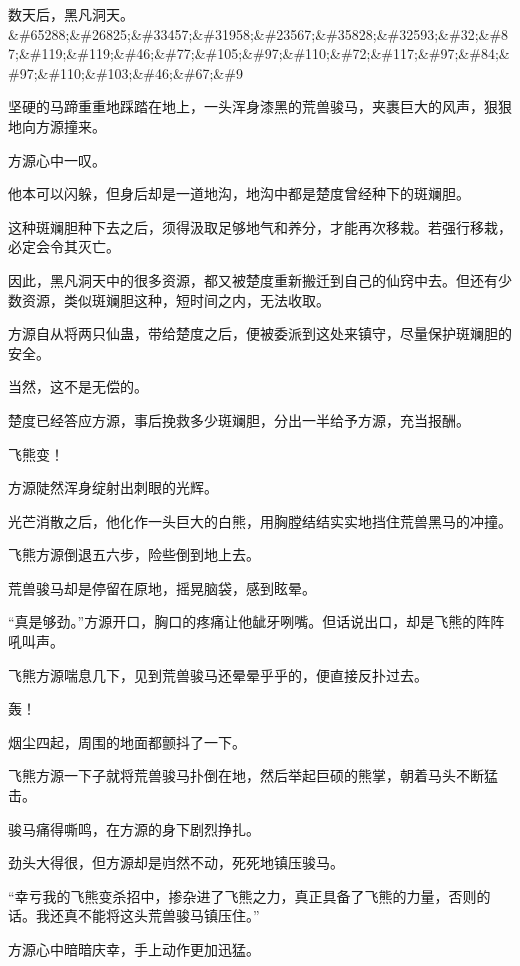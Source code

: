 
\begin{this_body}

数天后，黑凡洞天。\&\#65288;\&\#26825;\&\#33457;\&\#31958;\&\#23567;\&\#35828;\&\#32593;\&\#32;\&\#87;\&\#119;\&\#119;\&\#46;\&\#77;\&\#105;\&\#97;\&\#110;\&\#72;\&\#117;\&\#97;\&\#84;\&\#97;\&\#110;\&\#103;\&\#46;\&\#67;\&\#9

坚硬的马蹄重重地踩踏在地上，一头浑身漆黑的荒兽骏马，夹裹巨大的风声，狠狠地向方源撞来。

方源心中一叹。

他本可以闪躲，但身后却是一道地沟，地沟中都是楚度曾经种下的斑斓胆。

这种斑斓胆种下去之后，须得汲取足够地气和养分，才能再次移栽。若强行移栽，必定会令其灭亡。

因此，黑凡洞天中的很多资源，都又被楚度重新搬迁到自己的仙窍中去。但还有少数资源，类似斑斓胆这种，短时间之内，无法收取。

方源自从将两只仙蛊，带给楚度之后，便被委派到这处来镇守，尽量保护斑斓胆的安全。

当然，这不是无偿的。

楚度已经答应方源，事后挽救多少斑斓胆，分出一半给予方源，充当报酬。

飞熊变！

方源陡然浑身绽射出刺眼的光辉。

光芒消散之后，他化作一头巨大的白熊，用胸膛结结实实地挡住荒兽黑马的冲撞。

飞熊方源倒退五六步，险些倒到地上去。

荒兽骏马却是停留在原地，摇晃脑袋，感到眩晕。

“真是够劲。”方源开口，胸口的疼痛让他龇牙咧嘴。但话说出口，却是飞熊的阵阵吼叫声。

飞熊方源喘息几下，见到荒兽骏马还晕晕乎乎的，便直接反扑过去。

轰！

烟尘四起，周围的地面都颤抖了一下。

飞熊方源一下子就将荒兽骏马扑倒在地，然后举起巨硕的熊掌，朝着马头不断猛击。

骏马痛得嘶鸣，在方源的身下剧烈挣扎。

劲头大得很，但方源却是岿然不动，死死地镇压骏马。

“幸亏我的飞熊变杀招中，掺杂进了飞熊之力，真正具备了飞熊的力量，否则的话。我还真不能将这头荒兽骏马镇压住。”

方源心中暗暗庆幸，手上动作更加迅猛。


\end{this_body}
